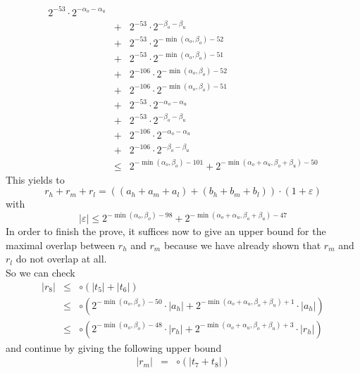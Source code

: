 \documentclass[a4paper,10pt,twoside]{article}
\newenvironment{proof}[1][Proof]{\begin{trivlist}
\item[\hskip \labelsep {\bfseries #1}]}{\end{trivlist}}
\newcommand{\hi}{\ensuremath{\mathit{h}}}
\newcommand{\mi}{\ensuremath{\mathit{m}}}
\newcommand{\lo}{\ensuremath{\mathit{l}}}
\renewcommand{\epsilon}{\varepsilon}
\begin{document}
\begin{proof}
\begin{eqnarray*}
2^{-53} \cdot 2^{-\alpha_o-\alpha_u} \\ & + &
2^{-53} \cdot 2^{-\beta_o-\beta_u} \\ & + &
2^{-53} \cdot 2^{-\min\left(\alpha_o,\beta_o\right)-52} \\ & + &
2^{-53} \cdot 2^{-\min\left(\alpha_o,\beta_o\right)-51} \\ & + &
2^{-106} \cdot 2^{-\min\left(\alpha_o,\beta_o\right)-52} \\ & + &
2^{-106} \cdot 2^{-\min\left(\alpha_o,\beta_o\right)-51} \\ & + &
2^{-53} \cdot 2^{-\alpha_o-\alpha_u} \\ & + &
2^{-53} \cdot 2^{-\beta_o-\beta_u} \\ & + &
2^{-106} \cdot 2^{-\alpha_o-\alpha_u} \\ & + &
2^{-106} \cdot 2^{-\beta_o-\beta_u} \\
& \leq & 2^{-\min\left(\alpha_o,\beta_o\right)-101} + 2^{-\min\left(\alpha_o+\alpha_u,\beta_o+\beta_u\right)-50}
\end{eqnarray*}
This yields to
$$r_\hi + r_\mi + r_\lo = \left( \left( a_\hi + a_\mi + a_\lo \right) + \left( b_\hi + b_\mi + b_\lo \right) \right) \cdot
\left(1 + \epsilon \right)$$
with
$$\left \vert \epsilon \right \vert \leq 2^{-\min\left(\alpha_o,\beta_o\right)-98} + 2^{-\min\left(\alpha_o+\alpha_u,\beta_o+\beta_u\right)-47}$$
In order to finish the prove, it suffices now to give an upper bound for the
maximal overlap between $r_\hi$ and $r_\mi$ because we have already shown that
$r_\mi$ and $r_\lo$ do not overlap at all.\\
So we can check
\begin{eqnarray*}
\left \vert r_8 \right \vert & \leq & \circ \left( \left \vert t_5 \right \vert + \left \vert t_6 \right \vert \right) \\
& \leq & \circ \left( 2^{-\min\left(\alpha_o,\beta_o\right)-50} \cdot \left \vert a_\hi \right \vert +
2^{-\min\left(\alpha_o+\alpha_u,\beta_o+\beta_u\right)+1} \cdot \left \vert a_\hi \right \vert \right)\\
& \leq & \circ \left( 2^{-\min\left(\alpha_o,\beta_o\right)-48} \cdot \left \vert r_\hi \right \vert +
2^{-\min\left(\alpha_o+\alpha_u,\beta_o+\beta_u\right)+3} \cdot \left \vert r_\hi \right \vert \right)
\end{eqnarray*}
and continue by giving the following upper bound
\begin{eqnarray*}
\left \vert r_\mi \right \vert & = & \circ \left( \left \vert t_7 + t_8 \right \vert \right) \\

\end{eqnarray*}
\end{proof}
\end{document}
